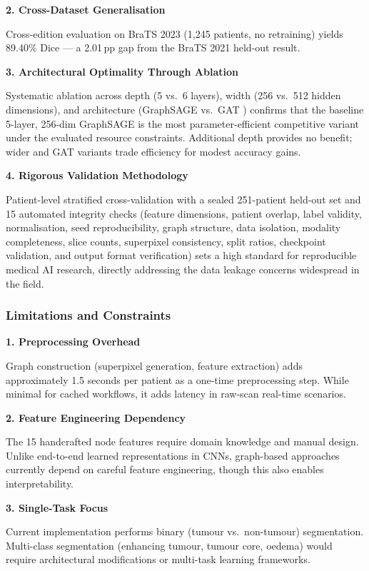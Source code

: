 \documentclass{article}
\begin{document}
\textbf{2. Cross-Dataset Generalisation}

Cross-edition evaluation on BraTS 2023 (1,245 patients, no retraining) yields 89.40\% Dice — a 2.01\,pp gap from the BraTS 2021 held-out result.

\textbf{3. Architectural Optimality Through Ablation}

Systematic ablation across depth (5 vs.\ 6 layers), width (256 vs.\ 512 hidden dimensions), and architecture (GraphSAGE vs.\ GAT \cite{velickovic2018gat}) confirms that the baseline 5-layer, 256-dim GraphSAGE is the most parameter-efficient competitive variant under the evaluated resource constraints. Additional depth provides no benefit; wider and GAT variants trade efficiency for modest accuracy gains.

\textbf{4. Rigorous Validation Methodology}

Patient-level stratified cross-validation with a sealed 251-patient held-out set and 15 automated integrity checks (feature dimensions, patient overlap, label validity, normalisation, seed reproducibility, graph structure, data isolation, modality completeness, slice counts, superpixel consistency, split ratios, checkpoint validation, and output format verification) sets a high standard for reproducible medical AI research, directly addressing the data leakage concerns widespread in the field.

\subsubsection{Limitations and Constraints}

\textbf{1. Preprocessing Overhead}

Graph construction (superpixel generation, feature extraction) adds approximately 1.5 seconds per patient as a one-time preprocessing step. While minimal for cached workflows, it adds latency in raw-scan real-time scenarios.

\textbf{2. Feature Engineering Dependency}

The 15 handcrafted node features require domain knowledge and manual design. Unlike end-to-end learned representations in CNNs, graph-based approaches currently depend on careful feature engineering, though this also enables interpretability.

\textbf{3. Single-Task Focus}

Current implementation performs binary (tumour vs.\ non-tumour) segmentation. Multi-class segmentation (enhancing tumour, tumour core, oedema) would require architectural modifications or multi-task learning frameworks.
\end{document}
